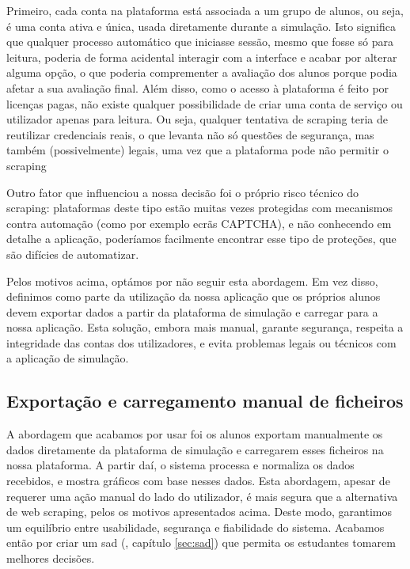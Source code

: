 Primeiro, cada conta na plataforma está associada a um grupo de alunos, ou seja, é uma conta ativa e única, usada diretamente durante a simulação. Isto significa que qualquer processo automático que iniciasse sessão, mesmo que fosse só para leitura, poderia de forma acidental interagir com a interface e acabar por alterar alguma opção, o que poderia comprementer a avaliação dos alunos porque podia afetar a sua avaliação final. Além disso, como o acesso à plataforma é feito por licenças pagas, não existe qualquer possibilidade de criar uma conta de serviço ou utilizador apenas para leitura. Ou seja, qualquer tentativa de scraping teria de reutilizar credenciais reais, o que levanta não só questões de segurança, mas também (possivelmente) legais, uma vez que a plataforma pode não permitir o scraping

Outro fator que influenciou a nossa decisão foi o próprio risco técnico do scraping: plataformas deste tipo estão muitas vezes protegidas com mecanismos contra automação (como por exemplo ecrãs CAPTCHA), e não conhecendo em detalhe a aplicação, poderíamos facilmente encontrar esse tipo de proteções, que são difícies de automatizar.

Pelos motivos acima, optámos por não seguir esta abordagem. Em vez disso, definimos como parte da utilização da nossa aplicação que os próprios alunos devem exportar dados a partir da plataforma de simulação e carregar para a nossa aplicação. Esta solução, embora mais manual, garante segurança, respeita a integridade das contas dos utilizadores, e evita problemas legais ou técnicos com a aplicação de simulação.

\subsection{Exportação e carregamento manual de ficheiros}

A abordagem que acabamos por usar foi os alunos exportam manualmente os dados diretamente da plataforma de simulação e carregarem esses ficheiros na nossa plataforma. A partir daí, o sistema processa e normaliza os dados recebidos, e mostra gráficos com base nesses dados. Esta abordagem, apesar de requerer uma ação manual do lado do utilizador, é mais segura que a alternativa de web scraping, pelos os motivos apresentados acima. Deste modo, garantimos um equilíbrio entre usabilidade, segurança e fiabilidade do sistema. Acabamos então por criar um \gls{sad} (\cf, capítulo \ref{sec:sad}) que permita os estudantes tomarem melhores decisões.

